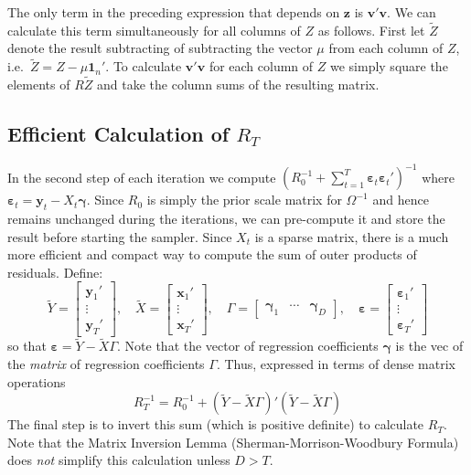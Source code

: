 \documentclass[12pt]{article}
\begin{document}
The only term in the preceding expression that depends on $\mathbf{z}$ is $\mathbf{v}'\mathbf{v}$.
We can calculate this term simultaneously for all columns of $Z$ as follows.
First let $\widetilde{Z}$ denote the result subtracting of subtracting the vector $\mu$ from each column of $Z$, i.e.\ $\widetilde{Z} = Z - \mu \mathbf{1}_n'$.
To calculate $\mathbf{v}'\mathbf{v}$ for each column of $Z$ we simply square the elements of $R\widetilde{Z}$ and take the column sums of the resulting matrix.


\subsection{Efficient Calculation of $R_T$}
In the second step of each iteration we compute 
$\left( R_0^{-1} + \sum_{t=1}^{T} \boldsymbol{\varepsilon}_t \boldsymbol{\varepsilon}_t'\right)^{-1}$ 
where 
$\boldsymbol{\varepsilon}_t=\mathbf{y}_t - X_t \boldsymbol{\gamma}$.
Since $R_0$ is simply the prior scale matrix for $\Omega^{-1}$ and hence remains unchanged during the iterations, we can pre-compute it and store the result before starting the sampler.
Since $X_t$ is a sparse matrix, there is a much more efficient and compact way to compute the sum of outer products of residuals.
Define:
\begin{equation*}
  \widetilde{Y} = \left[
  \begin{array}{c}
    \mathbf{y}_1'\\
    \vdots \\
    \mathbf{y}_T'
  \end{array}
\right], \quad \widetilde{X} = \left[
\begin{array}{c}
  \mathbf{x}_{1}' \\
  \vdots \\
  \mathbf{x}_{T}' 
\end{array}
\right], \quad \Gamma = \left[
\begin{array}{ccc}
  \boldsymbol{\gamma}_1 & \cdots & \boldsymbol{\gamma}_D
\end{array}
\right], \quad \boldsymbol{\varepsilon} = \left[
\begin{array}{c}
  \boldsymbol{\varepsilon}_1' \\
  \vdots \\
  \boldsymbol{\varepsilon}_T'
\end{array}
\right]
\end{equation*}
so that $\boldsymbol{\varepsilon} = \widetilde{Y} - \widetilde{X} \Gamma$.
Note that the vector of regression coefficients $\boldsymbol{\gamma}$ is the vec of the \emph{matrix} of regression coefficients $\Gamma$. 
Thus, expressed in terms of dense matrix operations
\begin{equation*}
  R_T^{-1} =  R_0^{-1} + \left( \widetilde{Y} - \widetilde{X} \Gamma \right)'\left( \widetilde{Y} - \widetilde{X} \Gamma \right)
\end{equation*}
The final step is to invert this sum (which is positive definite) to calculate $R_T$.
Note that the Matrix Inversion Lemma (Sherman-Morrison-Woodbury Formula) does \emph{not} simplify this calculation unless $D > T$.
\end{document}
